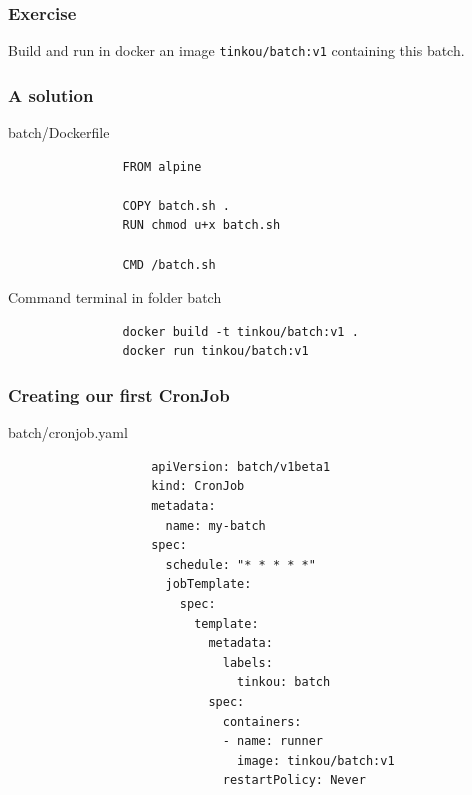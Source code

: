 	\begin{frame}[fragile]
		\frametitle{Exercise}
		
		Build and run in docker an image \verb|tinkou/batch:v1| containing this batch.
	\end{frame}

	\begin{frame}[fragile]
		\frametitle{A solution}
		
		\begin{block}{batch/Dockerfile}
			\begin{verbatim}
				FROM alpine
				
				COPY batch.sh .
				RUN chmod u+x batch.sh
				
				CMD /batch.sh
			\end{verbatim}
		\end{block}
		
		\begin{block}{Command terminal in folder batch}
			\begin{verbatim}
				docker build -t tinkou/batch:v1 .
				docker run tinkou/batch:v1
			\end{verbatim}
		\end{block}
	\end{frame}
				
	\begin{frame}[fragile]
		\frametitle{Creating our first CronJob}
		
		\begin{block}{batch/cronjob.yaml}
			\begin{tiny}
				\begin{verbatim}
					apiVersion: batch/v1beta1
					kind: CronJob
					metadata:
					  name: my-batch
					spec:
					  schedule: "* * * * *"
					  jobTemplate:
					    spec:
					      template:
					        metadata:
					          labels:
					            tinkou: batch
					        spec:
					          containers:
					          - name: runner
					            image: tinkou/batch:v1
					          restartPolicy: Never
				\end{verbatim}
			\end{tiny}
		\end{block}
	\end{frame}
	
